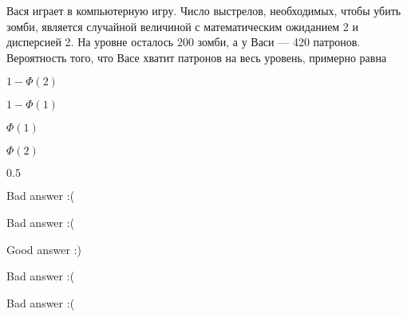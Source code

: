 
\begin{question}
Вася играет в компьютерную игру. Число выстрелов, необходимых, чтобы
убить зомби, является случайной величиной с математическим ожиданием 2 и
дисперсией 2. На уровне осталось 200 зомби, а у Васи — 420 патронов.
Вероятность того, что Васе хватит патронов на весь уровень, примерно
равна
\begin{answerlist}
  \item \(1 - \Phi(2)\)
  \item \(1 - \Phi(1)\)
  \item \(\Phi(1)\)
  \item \(\Phi(2)\)
  \item \(0.5\)
\end{answerlist}
\end{question}

\begin{solution}
\begin{answerlist}
  \item Bad answer :(
  \item Bad answer :(
  \item Good answer :)
  \item Bad answer :(
  \item Bad answer :(
\end{answerlist}
\end{solution}

